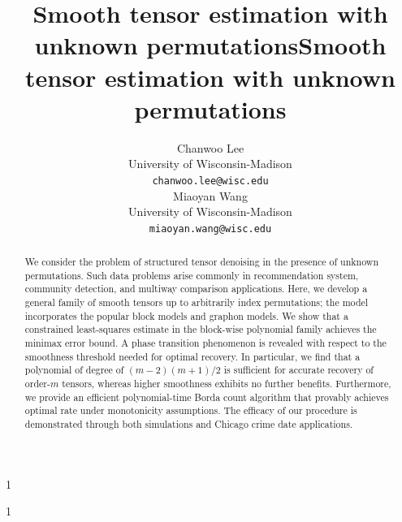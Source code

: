 \documentclass{article}
\newcommand{\blind}{1}
\theoremstyle{definition}
\begin{document}
\blind
{   \title{Smooth tensor estimation with 
unknown permutations}
\author{%
  Chanwoo Lee \\
  University of Wisconsin-Madison\\
  \texttt{chanwoo.lee@wisc.edu} \\
   \And
   Miaoyan Wang \\
   University of Wisconsin-Madison \\
   \texttt{miaoyan.wang@wisc.edu} }

    \maketitle
} \fi

\blind
{
 \date{}
  \title{Smooth tensor estimation with unknown permutations}
\author{}
\maketitle
} \fi

\vspace{-.3cm}
\begin{abstract}
 We consider the problem of structured tensor denoising in the presence of unknown permutations. Such data problems arise commonly in recommendation system, community detection, and multiway comparison applications. Here, we develop a general family of smooth tensors up to arbitrarily index permutations; the model incorporates the popular block models and graphon models. We show that a constrained least-squares estimate in the block-wise polynomial family achieves the minimax error bound. A phase transition phenomenon is revealed with respect to the smoothness threshold needed for optimal recovery. In particular, we find that a polynomial of degree of $(m-2)(m+1)/2$ is sufficient for accurate recovery of order-$m$ tensors, whereas higher smoothness exhibits no further benefits. Furthermore, we provide an efficient polynomial-time Borda count algorithm that provably achieves optimal rate under monotonicity assumptions. The efficacy of our procedure is demonstrated through both simulations and Chicago crime date applications. 
\end{abstract}
\end{document}

